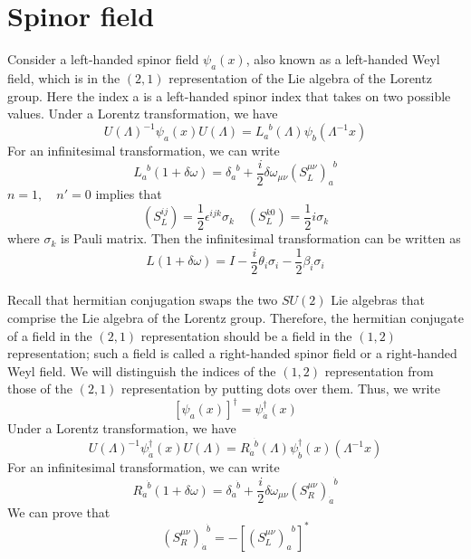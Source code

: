 \documentclass[cyan]{elegantnote}
\begin{document}
\section{Spinor field}
Consider a left-handed spinor field $\psi_a(x)$, also known as a left-handed Weyl field, which is in the $(2,1)$ representation of the Lie algebra of the Lorentz group. Here the index a is a left-handed spinor index that takes on two possible values. Under a Lorentz transformation, we have
\[U(\Lambda)^{-1} \psi_a(x) U(\Lambda) = L_a^{\phantom{a}b}(\Lambda) \psi_b(\Lambda^{-1}x)\]
For an infinitesimal transformation, we can write
\[L_a^{\phantom{a}b}(1+\delta \omega) = \delta_a^{\phantom{a}b} + \frac{i}{2} \delta \omega_{\mu \nu} (S_L^{\mu \nu})_a^{\phantom{a}b}\]
$n=1, \quad n'=0$  implies that
\[(S_L^{i j}) = \frac{1}{2}\epsilon^{ijk}\sigma_k \quad  (S_L^{k 0}) = \frac{1}{2}i\sigma_k\]
where $\sigma_k$ is Pauli matrix.
Then the infinitesimal transformation can be written as
\[L(1+\delta \omega) = I - \frac{i}{2} \theta_i \sigma_i -\frac{1}{2} \beta_i \sigma_i\]
\\
Recall that hermitian conjugation swaps the two $SU(2)$ Lie
algebras that comprise the Lie algebra of the Lorentz group.
Therefore, the hermitian conjugate of a field in the $(2,1)$ representation should be a field in the $(1,2)$ representation; such a field is called a right-handed spinor field or a right-handed Weyl field. We will distinguish the indices of the $(1,2)$ representation from those of the $(2,1)$ representation by putting dots over them. Thus, we write
\[[\psi_a(x)]^{\dagger} = \psi^{\dagger}_{\dot{a}}(x)\]
Under a Lorentz transformation, we have
\[U(\Lambda)^{-1} \psi^{\dagger}_{\dot{a}}(x) U(\Lambda) = R_{\dot{a}}^{\phantom{a}\dot{b}}(\Lambda) \psi^{\dagger}_{\dot{b}}(x)(\Lambda^{-1}x)\]
For an infinitesimal transformation, we can write
\[R_{\dot{a}}^{\phantom{a}\dot{b}}(1+\delta \omega) = \delta_{\dot{a}}^{\phantom{a}\dot{b}} + \frac{i}{2} \delta \omega_{\mu \nu} (S_R^{\mu \nu})_{\dot{a}}^{\phantom{a}\dot{b}}\]
We can prove that
\[(S_R^{\mu \nu})_{\dot{a}}^{\phantom{a}\dot{b}} = -[(S_L^{\mu \nu})_a^{\phantom{a}b}]^*\]
\end{document}
